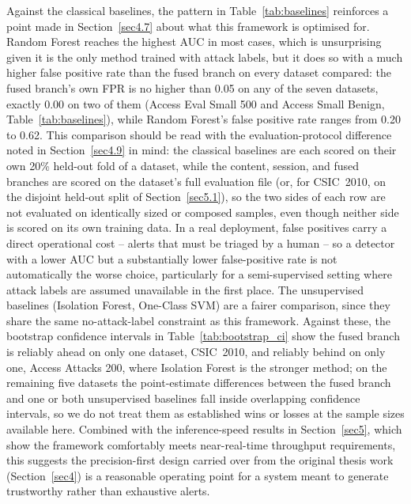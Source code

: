 \documentclass[futureinternet,article,submit,moreauthors]{Definitions/mdpi}
\begin{document}
Against the classical baselines, the pattern in Table~\ref{tab:baselines} reinforces a point made in Section~\ref{sec4.7} about what this framework is optimised for. Random Forest reaches the highest AUC in most cases, which is unsurprising given it is the only method trained with attack labels, but it does so with a much higher false positive rate than the fused branch on every dataset compared: the fused branch's own FPR is no higher than 0.05 on any of the seven datasets, exactly 0.00 on two of them (Access Eval Small 500 and Access Small Benign, Table~\ref{tab:baselines}), while Random Forest's false positive rate ranges from 0.20 to 0.62. This comparison should be read with the evaluation-protocol difference noted in Section~\ref{sec4.9} in mind: the classical baselines are each scored on their own 20\% held-out fold of a dataset, while the content, session, and fused branches are scored on the dataset's full evaluation file (or, for CSIC~2010, on the disjoint held-out split of Section~\ref{sec5.1}), so the two sides of each row are not evaluated on identically sized or composed samples, even though neither side is scored on its own training data. In a real deployment, false positives carry a direct operational cost -- alerts that must be triaged by a human -- so a detector with a lower AUC but a substantially lower false-positive rate is not automatically the worse choice, particularly for a semi-supervised setting where attack labels are assumed unavailable in the first place. The unsupervised baselines (Isolation Forest, One-Class SVM) are a fairer comparison, since they share the same no-attack-label constraint as this framework. Against these, the bootstrap confidence intervals in Table~\ref{tab:bootstrap_ci} show the fused branch is reliably ahead on only one dataset, CSIC~2010, and reliably behind on only one, Access Attacks 200, where Isolation Forest is the stronger method; on the remaining five datasets the point-estimate differences between the fused branch and one or both unsupervised baselines fall inside overlapping confidence intervals, so we do not treat them as established wins or losses at the sample sizes available here. Combined with the inference-speed results in Section~\ref{sec5}, which show the framework comfortably meets near-real-time throughput requirements, this suggests the precision-first design carried over from the original thesis work (Section~\ref{sec4}) is a reasonable operating point for a system meant to generate trustworthy rather than exhaustive alerts.
\end{document}
